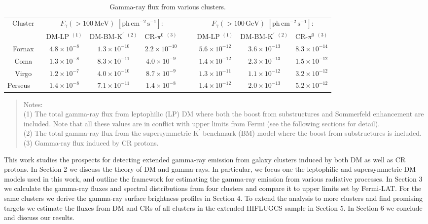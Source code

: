 \documentclass[10pt,aps,pra,reprint,amsmath,amsfonts,amssymb,showpacs,nofootinbib,floatfix]{revtex4-1}
\newcommand{\rmn}{\mathrm}
\newcommand{\Kp}{\rmn{K}^\prime}
\begin{document}
\begin{table}
\begin{minipage}{2.0\columnwidth}
  \caption{Gamma-ray flux from various clusters.}
\begin{tabular}{c  c c c  c  c c c}
\hline
\hline
 Cluster &
\multicolumn{3}{c}{$F_{\gamma}(>100\,\rmn{MeV})$ $[\rmn{ph}\,\rmn{cm}^{-2}\,\rmn{s}^{-1}]$:} & &
\multicolumn{3}{c}{$F_{\gamma}(>100\,\rmn{GeV})$ $[\rmn{ph}\,\rmn{cm}^{-2}\,\rmn{s}^{-1}]$:} \\
         & DM-LP $^{(1)}$ & DM-BM-$\Kp$ $^{(2)}$ & CR-$\pi^0$ $^{(3)}$ 
         & & DM-LP $^{(1)}$ & DM-BM-$\Kp$ $^{(2)}$ & CR-$\pi^0$ $^{(3)}$ \\
 \hline
Fornax               & $4.8\times10^{-8}$ & $1.3\times10^{-10}$ &  $2.2\times10^{-10}$ 
& \,\,\,\,\, & $5.6\times10^{-12}$  & $3.6\times10^{-13}$ & $8.3\times10^{-14}$ \\
Coma                 & $1.3\times10^{-8}$ & $8.3\times10^{-11}$ &  $4.0\times10^{-9}$  
& \,\,\,\,\, & $1.4\times10^{-12}$  & $2.3\times10^{-13}$ & $1.5\times10^{-12}$ \\
Virgo                & $1.2\times10^{-7}$ & $4.0\times10^{-10}$ &  $8.7\times10^{-9}$  
& \,\,\,\,\, & $1.3\times10^{-11}$  & $1.1\times10^{-12}$ & $3.2\times10^{-12}$ \\
Perseus \,\,\,\,\,\, & $1.4\times10^{-8}$ & $7.1\times10^{-11}$ &  $1.4\times10^{-8}$  
& \,\,\,\,\, & $1.4\times10^{-12}$  & $2.0\times10^{-13}$ & $5.2\times10^{-12}$ \\
\hline
\hline
\end{tabular}
\begin{quote}
  Notes: \\
  (1) The total gamma-ray flux from leptophilic (LP) DM where both the
  boost from substructures and Sommerfeld enhancement are
  included. Note that all these values are in conflict with upper limits from
  Fermi (see the following sections for detail).\\
 (2) The total gamma-ray flux from the supersymmetric $\Kp$ benchmark (BM) 
 model where the boost from substructures is included.\\
 (3) Gamma-ray flux induced by CR protons.
 \label{tab:flux_tab}
  \end{quote}
\end{minipage}
\end{table} 

This work studies the prospects for detecting extended gamma-ray
emission from galaxy clusters induced by both DM as well as CR
protons. In Section 2 we discuss the theory of DM and gamma-rays. In
particular, we focus one the leptophilic and supersymmetric DM models
used in this work, and outline the framework for estimating the
gamma-ray emission from various radiative processes. In Section 3
we calculate the gamma-ray fluxes and spectral distributions from four
clusters and compare it to upper limits set by Fermi-LAT. For the same
clusters we derive the gamma-ray surface brightness profiles in
Section 4. To extend the analysis to more clusters and find
promising targets we estimate the fluxes from DM and CRs of all
clusters in the extended HIFLUGCS sample in Section 5. In Section
6 we conclude and discuss our results.
\end{document}
